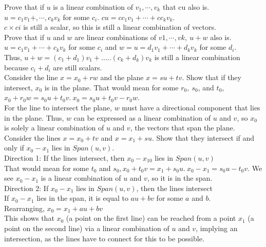 \documentclass[12pt]{article}
\begin{document}
Prove that if $u$ is a linear combination of $v_1,\cdots, v_k$ that cu also is.\\
$u = c_1v_1+,\cdots,c_kv_k$ for some $c_i$. $cu = cc_1v_1+\cdots+cc_kv_k$.\\
$c \times ci$ is still a scalar, so this is still a linear combination of vectors.\\

Prove that if $u$ and $w$ are linear combinations of $v1,\cdots,vk, ~ u+w$ also is.\\
$u = c_1v_1+\cdots+c_kv_k$ for some $c_i$ and $w = u = d_1v_1+\cdots+d_kv_k$ for some $d_i$. \\
Thus, $u+w=(c_1+d_1)v_1+.....(c_k+d_k)v_k$ is still a linear combination because $c_i+d_i$ are still scalars.\\

Consider the line $x=x_0+rw$ and the plane $x=su+tv$. Show that if they intersect, $x_0$ is in the plane. 
That would mean for some $r_0, ~s_0$, and $t_0$, $x_0+r_0w = s_0u+t_0v. ~x_0 = s_0u+t_0v-r_0w$.\\
For the line to intersect the plane, $w$ must have a directional component that lies in the plane. Thus, $w$ can be expressed as a linear combination of $u$ and $v$, so $x_0$ is solely a linear combination of $u$ and $v$, the vectors that span the plane.\\

Consider the lines $x = x_0 + tv$ and $x= x_1+su$. Show that they intersect if and only if $x_0-x_1$ lies in $Span(u,v)$.\\
Direction 1: If the lines intersect, then $x_0-x_{10}$ lies in $Span(u,v)$\\
That would mean for some $t_0$ and $s_0, x_0+t_0v=x_1+s_0u. ~x_0-x_1=s_0u-t_0v$. We see $x_0-x_1$ is a linear combination of $u$ and $v$, so it is in the span.\\
Direction 2: If $x_0-x_1$ lies in $Span(u,v)$, then the lines intersect\\
If $x_0-x_1$ lies in the span, it is equal to $au+bv$ for some $a$ and $b$.\\
Rearranging, $x_0=x_1+au+bv$\\
This shows that $x_0$ (a point on the first line) can be reached from a point $x_1$ (a point on the second line) via a linear combination of $u$ and $v$, implying an intersection, as the lines have to connect for this to be possible.\\
\end{document}
